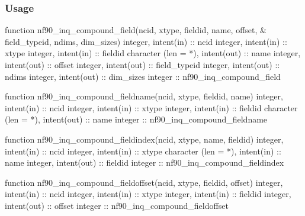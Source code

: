 \subsubsection*{Usage}


\begin{DoxyCode}
\textcolor{keyword}{function }nf90\_inq\_compound\_field(ncid, xtype, fieldid, name, offset, &
     field\_typeid, ndims, dim\_sizes)
  \textcolor{keywordtype}{integer}, \textcolor{keywordtype}{intent(in)} :: ncid
  \textcolor{keywordtype}{integer}, \textcolor{keywordtype}{intent(in)} :: xtype
  \textcolor{keywordtype}{integer}, \textcolor{keywordtype}{intent(in)} :: fieldid
  \textcolor{keywordtype}{character (len = *)}, \textcolor{keywordtype}{intent(out)} :: name
  \textcolor{keywordtype}{integer}, \textcolor{keywordtype}{intent(out)} :: offset
  \textcolor{keywordtype}{integer}, \textcolor{keywordtype}{intent(out)} :: field\_typeid
  \textcolor{keywordtype}{integer}, \textcolor{keywordtype}{intent(out)} :: ndims
  \textcolor{keywordtype}{integer}, \textcolor{keywordtype}{intent(out)} :: dim\_sizes
  \textcolor{keywordtype}{integer} :: nf90\_inq\_compound\_field

\textcolor{keyword}{function }nf90\_inq\_compound\_fieldname(ncid, xtype, fieldid, name)
  \textcolor{keywordtype}{integer}, \textcolor{keywordtype}{intent(in)} :: ncid
  \textcolor{keywordtype}{integer}, \textcolor{keywordtype}{intent(in)} :: xtype
  \textcolor{keywordtype}{integer}, \textcolor{keywordtype}{intent(in)} :: fieldid
  \textcolor{keywordtype}{character (len = *)}, \textcolor{keywordtype}{intent(out)} :: name
  \textcolor{keywordtype}{integer} :: nf90\_inq\_compound\_fieldname

\textcolor{keyword}{function }nf90\_inq\_compound\_fieldindex(ncid, xtype, name, fieldid)
  \textcolor{keywordtype}{integer}, \textcolor{keywordtype}{intent(in)} :: ncid
  \textcolor{keywordtype}{integer}, \textcolor{keywordtype}{intent(in)} :: xtype
  \textcolor{keywordtype}{character (len = *)}, \textcolor{keywordtype}{intent(in)} :: name
  \textcolor{keywordtype}{integer}, \textcolor{keywordtype}{intent(out)} :: fieldid
  \textcolor{keywordtype}{integer} :: nf90\_inq\_compound\_fieldindex

\textcolor{keyword}{function }nf90\_inq\_compound\_fieldoffset(ncid, xtype, fieldid, offset)
  \textcolor{keywordtype}{integer}, \textcolor{keywordtype}{intent(in)} :: ncid
  \textcolor{keywordtype}{integer}, \textcolor{keywordtype}{intent(in)} :: xtype
  \textcolor{keywordtype}{integer}, \textcolor{keywordtype}{intent(in)} :: fieldid
  \textcolor{keywordtype}{integer}, \textcolor{keywordtype}{intent(out)} :: offset
  \textcolor{keywordtype}{integer} :: nf90\_inq\_compound\_fieldoffset


\end{DoxyCode}

